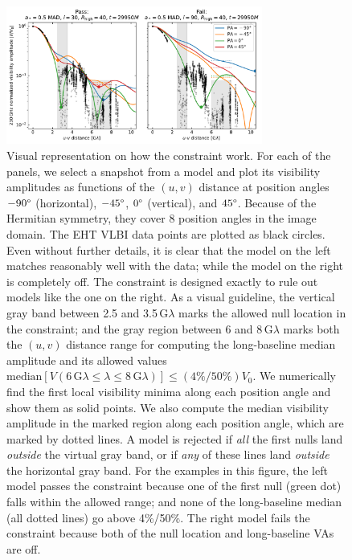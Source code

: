 \begin{figure}
  \centering
  \includegraphics[width=0.75\textwidth]{figures/passfail_va.pdf}
  \caption{Visual representation on how the \vam constraint work.
    For each of the panels, we select a snapshot from a model and plot
    its visibility amplitudes as functions of the $(u,v)$ distance at
    position angles $-90\degree$ (horizontal), $-45\degree$,
    $0\degree$ (vertical), and $45\degree$.
    Because of the Hermitian symmetry, they cover 8 position angles in
    the image domain.
    The EHT \aprilvii VLBI data points are plotted as black circles.
    Even without further details, it is clear that the model on the
    left matches reasonably well with the data; while the model on
    the right is completely off.
    The \vam constraint is designed exactly to rule out models like
    the one on the right.
    As a visual guideline, the vertical gray band between 2.5 and
    3.5$\,\mathrm{G}\lambda$ marks the allowed null location in the
    \vam constraint; and the gray region between 6 and
    8$\,\mathrm{G}\lambda$ marks both the $(u,v)$ distance range for
    computing the long-baseline median amplitude and its allowed
    values $\mathrm{median}[V(6\,\mathrm{G}\lambda \leq \lambda \leq
      8\,\mathrm{G}\lambda)] \leq (4\%/50\%) V_0$.
    We numerically find the first local visibility minima along each
    position angle and show them as solid points.
    We also compute the median visibility amplitude in the marked
    region along each position angle, which are marked by dotted lines.
    A model is rejected if \emph{all} the first nulls land
    \emph{outside} the virtual gray band, or if \emph{any} of these
    lines land \emph{outside} the horizontal gray band.
    For the examples in this figure, the left model passes the \vam
    constraint because one of the first null (green dot) falls within
    the allowed range; and none of the long-baseline median (all
    dotted lines) go above 4\%/50\%.
    The right model fails the \vam constraint because both of the null
    location and long-baseline VAs are off.}
  \label{fig:passfail_va}
\end{figure}

